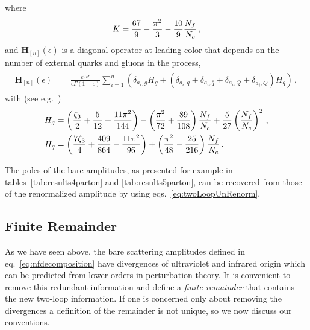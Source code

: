 where 
\begin{equation}
K=\frac{67}{9}-\frac{\pi ^2}{3}-\frac{10}{9}\frac{{N_f}}{{N_c}}\,,
\end{equation}
and $\mathbf{H}_{[n]}(\epsilon)$ is a diagonal operator at 
leading color that depends on the number of external quarks 
and gluons in the process,
\begin{align}
  \begin{split}
    \mathbf{H}_{[n]}(\epsilon)&=
    \frac{e^{\gamma_E\epsilon}}{\epsilon\Gamma(1-\epsilon)}
    \sum_{i=1}^n\left(
    \delta_{a_i,g}H_g+
    (\delta_{a_i,q}+\delta_{a_i,\bar q}
    +\delta_{a_i,Q}+\delta_{a_i,\bar Q})
    H_q
    \right)\,,
  \end{split}
\end{align}
with (see e.g.\ \cite{Bern:2003ck})
\begin{align}
  \begin{split}
    H_g&= \left(\frac{\zeta_3}{2}+\frac{5}{12}+
    \frac{11\pi^2}{144}\right)
    -\left(\frac{\pi^2}{72}+\frac{89}{108}\right)\frac{N_f}{{N_c}}
    +\frac{5}{27}\left(\frac{N_f}{{N_c}}\right)^2\,,\\
    H_q&=
    \left(\frac{7\zeta_3}{4}+\frac{409}{864}
    -\frac{11\pi^2}{96}\right)
    +\left(\frac{\pi^2}{48}-\frac{25}{216}\right)\frac{N_f}{{N_c}}\,.
  \end{split}
\end{align}

The poles of the bare amplitudes, as presented for example in
tables~\ref{tab:results4parton} and \ref{tab:results5parton}, can be recovered
from those of the renormalized amplitude by using
eqs.~\eqref{eq:twoLoopUnRenorm}.

\subsection{Finite Remainder}\label{sec:remainders}

As we have seen above,
the bare scattering amplitudes defined in eq.~\eqref{eq:nfdecomposition}
have divergences of ultraviolet and infrared origin which can be predicted from lower orders in perturbation theory.
It is convenient to remove this redundant information and define a \emph{finite remainder} that contains the new two-loop information.
If one is concerned only about removing the divergences a definition of the remainder is not unique, so we now discuss our conventions.

